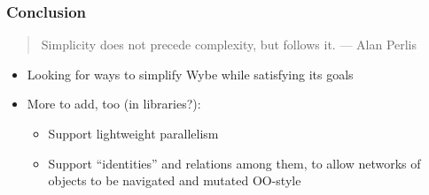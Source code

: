 \documentclass[12pt]{beamer}
\begin{document}
\begin{frame}
\frametitle{Conclusion}
\begin{quotation}
\noindent
Simplicity does not precede complexity, but follows it.
\hspace*{3em}--- Alan Perlis
\end{quotation}
\vspace{3ex}
\begin{itemize}
\item Looking for ways to simplify Wybe while satisfying its goals
\item More to add, too (in libraries?):
  \begin{itemize}
  \item Support lightweight parallelism
  \item Support ``identities'' and relations among them, to allow
    networks of objects to be navigated and mutated OO-style
  \end{itemize}

\end{itemize}
\end{frame}


\end{document}
